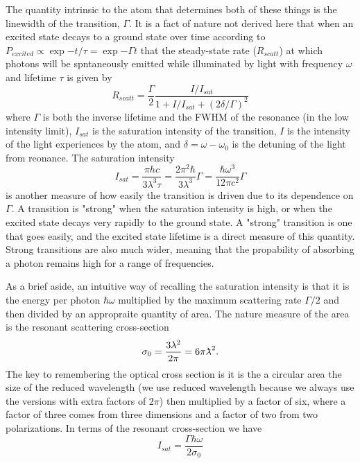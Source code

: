 \documentclass[../../main.tex]{subfiles}
\begin{document}
The quantity intrinsic to the atom that determines both of these things is the linewidth of the transition, $\Gamma$. It is a fact of nature not derived here that when an excited state decays to a ground state over time according to $P_{excited}\propto \exp{-t/\tau}=\exp{-\Gamma t}$ that the steady-state rate ($R_{scatt}$) at which photons will be spntaneously emitted while illuminated by light with frequency $\omega$ and lifetime $\tau$ is given by 
\begin{equation}\label{eq. scatteringrate}
    R_{scatt}=\frac{\Gamma}{2}\frac{I/I_{sat}}{1+I/I_{sat}+(2\delta/\Gamma)^2}
\end{equation}
where $\Gamma$ is both the inverse lifetime and the FWHM of the resonance (in the low intensity limit), $I_{sat}$ is the saturation intensity of the transition, $I$ is the intensity of the light experiences by the atom, and $\delta = \omega-\omega_0$ is the detuning of the light from reonance. The saturation intensity 
\begin{equation}
    I_{sat}=\frac{\pi h c}{3\lambda^3\tau}=\frac{2\pi^2\hbar}{3\lambda^3}\Gamma =\frac{\hbar\omega^3}{12\pi c^2}\Gamma
\end{equation}
is another measure of how easily the transition is driven due to its dependence on $\Gamma$. A transition is "strong" when the saturation intensity is high, or when the excited state decays very rapidly to the ground state. A "strong" transition is one that goes easily, and the excited state lifetime is a direct measure of this quantity. Strong transitions are also much wider, meaning that the propability of absorbing a photon remains high for a range of frequencies. 

As a brief aside, an intuitive way of recalling the saturation intensity is that it is the energy per photon $\hbar\omega$ multiplied by the maximum scattering rate $\Gamma/2$ and then divided by an appropraite quantity of area. The nature measure of the area is the resonant scattering cross-section $$\sigma_0 = \frac{3\lambda^2}{2\pi}=6\pi\lambdabar^2.$$ The key to remembering the optical cross section is it is the a circular area the size of the reduced wavelength (we use reduced wavelength because we always use the versions with extra factors of $2\pi$) then multiplied by a factor of six, where a factor of three comes from three dimensions and a factor of two from two polarizations. In terms of the resonant cross-section we have
$$I_{sat}=\frac{\Gamma\hbar\omega}{2\sigma_0}$$
\end{document}
